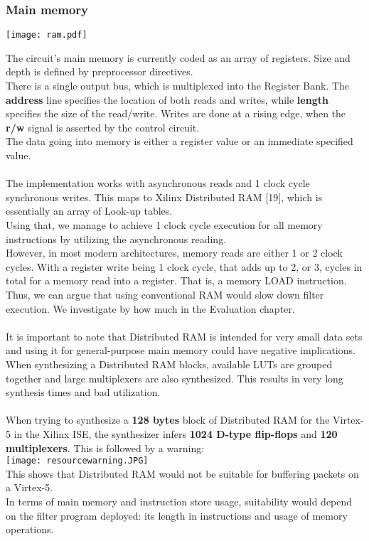 \documentclass{l4proj}
\begin{document}
\subsubsection{Main memory}
\begin{center}
\texttt{[image: ram.pdf]}\\
\end{center}
The circuit's main memory is currently coded as an array of registers. Size and depth is defined by preprocessor directives.\\
There is a single output bus, which is multiplexed into the Register Bank. The \textbf{address} line specifies the location of both reads and writes, while \textbf{length} specifies the size of the read/write. Writes are done at a rising edge, when the \textbf{r/w} signal is asserted by the control circuit.\\
The data going into memory is either a register value or an immediate specified value.\\\\
The implementation works with asynchronous reads and 1 clock cycle synchronous writes. This maps to Xilinx Distributed RAM [19], which is essentially an array of Look-up tables.\\
Using that, we manage to achieve 1 clock cycle execution for all memory instructions by utilizing the asynchronous reading.\\
However, in most modern architectures, memory reads are either 1 or 2 clock cycles. With a register write being 1 clock cycle, that adds up to 2, or 3, cycles in total for a memory read into a register. That is, a memory LOAD instruction. Thus, we can argue that using conventional RAM would slow down filter execution. We investigate by how much in the Evaluation chapter.\\\\
It is important to note that Distributed RAM is intended for very small data sets and using it for general-purpose main memory could have negative implications.\\
When synthesizing a Distributed RAM blocks, available LUTs are grouped together and large multiplexers are also synthesized. This results in very long synthesis times and bad utilization.\\\\
When trying to synthesize a \textbf{128 bytes} block of Distributed RAM for the Virtex-5 in the Xilinx ISE, the synthesizer infers \textbf{1024 D-type flip-flops} and \textbf{120 multiplexers}. This is followed by a warning:\\
\texttt{[image: resourcewarning.JPG]}\\
This shows that Distributed RAM would not be suitable for buffering packets on a Virtex-5.\\
In terms of main memory and instruction store usage, suitability would depend on the filter program deployed: its length in instructions and usage of memory operations.
\end{document}
